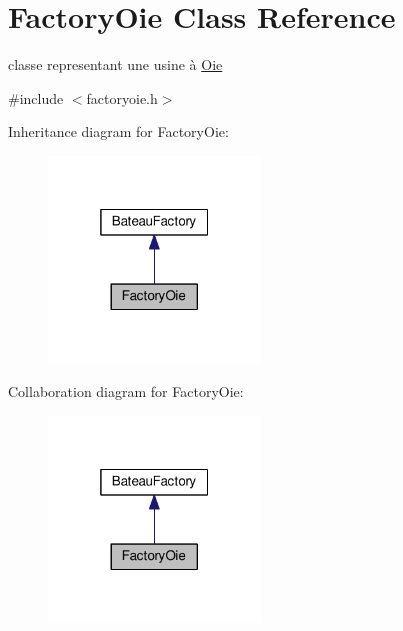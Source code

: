 \hypertarget{classFactoryOie}{\section{Factory\+Oie Class Reference}
\label{classFactoryOie}
}


classe representant une usine à \hyperlink{classOie}{Oie}  




{\ttfamily \#include $<$factoryoie.\+h$>$}



Inheritance diagram for Factory\+Oie\+:
\nopagebreak
\begin{figure}[H]
\begin{center}
\leavevmode
\includegraphics[width=160pt]{classFactoryOie__inherit__graph}
\end{center}
\end{figure}


Collaboration diagram for Factory\+Oie\+:
\nopagebreak
\begin{figure}[H]
\begin{center}
\leavevmode
\includegraphics[width=160pt]{classFactoryOie__coll__graph}
\end{center}
\end{figure}
